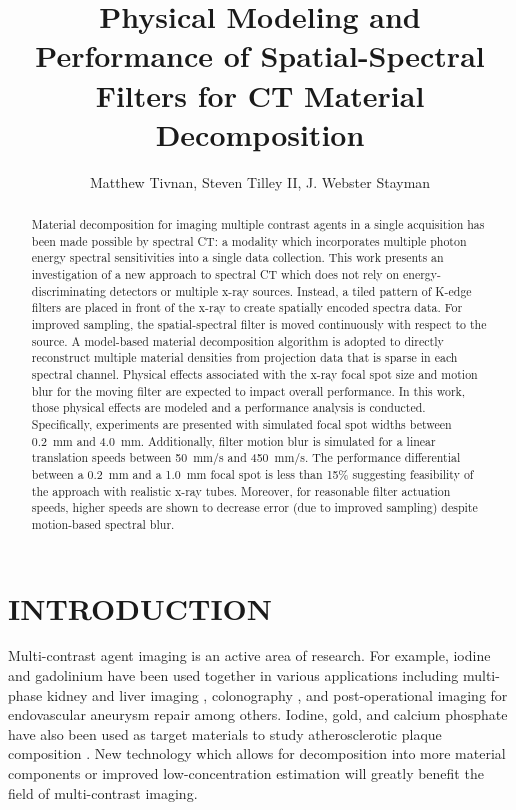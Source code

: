 \documentclass[]{spie}  %
\title{Physical Modeling and Performance of Spatial-Spectral Filters for CT Material Decomposition}
\author[]{Matthew Tivnan, Steven Tilley II, J. Webster Stayman}
\affil[]{\normalsize\em Department of Biomedical Engineering, Johns Hopkins University, Baltimore MD, USA 21205}
\begin{document}
 
\maketitle
\begin{abstract}
Material decomposition for imaging multiple contrast agents in a single acquisition has been made possible by spectral CT: a modality which incorporates multiple photon energy spectral sensitivities into a single data collection. This work presents an investigation of a new approach to spectral CT which does not rely on energy-discriminating detectors or multiple x-ray sources. Instead, a tiled pattern of K-edge filters are placed in front of the x-ray to create spatially encoded spectra data. For improved sampling, the spatial-spectral filter is moved continuously with respect to the source. A model-based material decomposition algorithm is adopted to directly reconstruct multiple material densities from projection data that is sparse in each spectral channel. Physical effects associated with the x-ray focal spot size and motion blur for the moving filter are expected to impact overall performance. In this work, those physical effects are modeled and a performance analysis is conducted. Specifically, experiments are presented with simulated focal spot widths between 0.2~mm and 4.0~mm. Additionally, filter motion blur is simulated for a linear translation speeds between 50~mm/s and 450~mm/s. The performance differential between a 0.2~mm and a 1.0~mm focal spot is less than 15\% suggesting feasibility of the approach with realistic x-ray tubes. Moreover, for reasonable filter actuation speeds, higher speeds are shown to decrease error (due to improved sampling) despite motion-based spectral blur.
\end{abstract}


\section{INTRODUCTION}
\label{sec:intro}  %
Multi-contrast agent imaging is an active area of research. For example, iodine and gadolinium have been used together in various applications including multi-phase kidney and liver imaging \cite{symons2017photon}, colonography \cite{muenzel2016spectral}, and post-operational imaging for endovascular aneurysm repair \cite{dangelmaier2018experimental} among others. Iodine, gold, and calcium phosphate have also been used as target materials to study atherosclerotic plaque composition \cite{cormode2010atherosclerotic,baturin2012spectral}. New technology which allows for decomposition into more material components or improved low-concentration estimation will greatly benefit the field of multi-contrast imaging.
\end{document}
